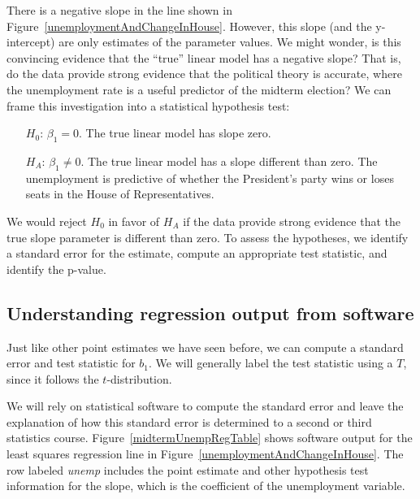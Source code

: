 There is a negative slope in the line shown in
Figure~\ref{unemploymentAndChangeInHouse}.
However, this slope (and the y-intercept) are only estimates
of the parameter values.
We might wonder, is this convincing evidence that the ``true''
linear model has a negative slope?
That is, do the data provide strong evidence that the political
theory is accurate, where the unemployment rate is a useful
predictor of the midterm election?
We can frame this investigation into a statistical hypothesis
test:
\begin{itemize}
\item[$H_0$:]
    $\beta_1 = 0$.
    The true linear model has slope zero.
\item[$H_A$:]
    $\beta_1 \neq 0$.
    The true linear model has a slope different than zero.
    The unemployment is predictive of whether the President's
    party wins or loses seats in the House of Representatives.
\end{itemize}
We would reject $H_0$ in favor of $H_A$ if the data provide
strong evidence that the true slope parameter is different
than zero.
To assess the hypotheses, we identify a standard error
for the estimate, compute an appropriate test statistic,
and identify the p-value.


\subsection{Understanding regression output from software}
\label{testStatisticForTheSlope}

\newcommand{\midtermshouseDF}{27}

Just like other point estimates we have seen before,
we can compute a standard error and test statistic for $b_1$.
We will generally label the test statistic using a $T$,
since it follows the $t$-distribution.

We will rely on statistical software to compute the standard
error and leave the explanation of how this standard error
is determined to a second or third statistics course.
Figure~\ref{midtermUnempRegTable} shows software output for
the least squares regression line in
Figure~\ref{unemploymentAndChangeInHouse}.
The row labeled \emph{unemp} includes the point estimate
and other hypothesis test information for the slope,
which is the coefficient of the unemployment variable.

